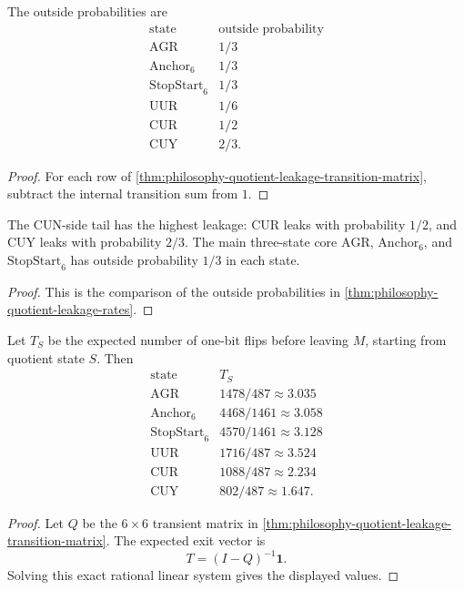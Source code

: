 \begin{theorem}
\label{thm:philosophy-quotient-leakage-rates}
The outside probabilities are
$$
\begin{array}{c|r}
  \text{state} & \text{outside probability}\\
  \hline
  \mathrm{AGR} & 1/3\\
  \mathrm{Anchor}_{6} & 1/3\\
  \mathrm{StopStart}_{6} & 1/3\\
  \mathrm{UUR} & 1/6\\
  \mathrm{CUR} & 1/2\\
  \mathrm{CUY} & 2/3.
\end{array}
$$
\end{theorem}
\begin{proof}
For each row of
\autoref{thm:philosophy-quotient-leakage-transition-matrix}, subtract
the internal transition sum from $1$.
\end{proof}

\begin{corollary}
\label{cor:philosophy-cun-tail-leakage}
The CUN-side tail has the highest leakage: $\mathrm{CUR}$ leaks with
probability $1/2$, and $\mathrm{CUY}$ leaks with probability $2/3$.
The main three-state core $\mathrm{AGR}$, $\mathrm{Anchor}_{6}$, and
$\mathrm{StopStart}_{6}$ has outside probability $1/3$ in each state.
\end{corollary}
\begin{proof}
This is the comparison of the outside probabilities in
\autoref{thm:philosophy-quotient-leakage-rates}.
\end{proof}

\begin{theorem}
\label{thm:philosophy-quotient-expected-exit-times}
Let $T_S$ be the expected number of one-bit flips before leaving $M$,
starting from quotient state $S$. Then
$$
\begin{array}{c|r}
  \text{state} & T_S\\
  \hline
  \mathrm{AGR} & 1478/487 \approx 3.035\\
  \mathrm{Anchor}_{6} & 4468/1461 \approx 3.058\\
  \mathrm{StopStart}_{6} & 4570/1461 \approx 3.128\\
  \mathrm{UUR} & 1716/487 \approx 3.524\\
  \mathrm{CUR} & 1088/487 \approx 2.234\\
  \mathrm{CUY} & 802/487 \approx 1.647.
\end{array}
$$
\end{theorem}
\begin{proof}
Let $Q$ be the $6\times 6$ transient matrix in
\autoref{thm:philosophy-quotient-leakage-transition-matrix}. The
expected exit vector is
$$
  T=(I-Q)^{-1}\mathbf{1}.
$$
Solving this exact rational linear system gives the displayed values.
\end{proof}

